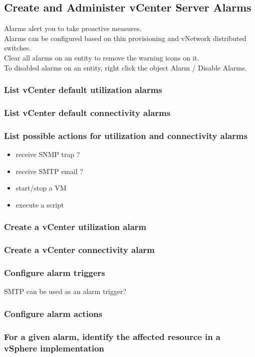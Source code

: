 \subsection{Create and Administer vCenter Server Alarms}

Alarms alert you to take proactive measures.\\

Alarms can be configured based on thin provisioning and vNetwork distributed
switches.\\

Clear all alarms on an entity to remove the warning icons on it.\\

To disabled alarms on an entity, right click the object Alarm / Disable
Alarms.

\subsubsection{List vCenter default utilization alarms}

\subsubsection{List vCenter default connectivity alarms}

\subsubsection{List possible actions for utilization and connectivity alarms}

\begin{itemize}
\item receive SNMP trap ?
\item receive SMTP email ?
\item start/stop a VM
\item execute a script
\end{itemize}

\subsubsection{Create a vCenter utilization alarm}

\subsubsection{Create a vCenter connectivity alarm}

\subsubsection{Configure alarm triggers}

SMTP can be used as an alarm trigger?

\subsubsection{Configure alarm actions}

\subsubsection{For a given alarm, identify the affected resource in a vSphere implementation}
